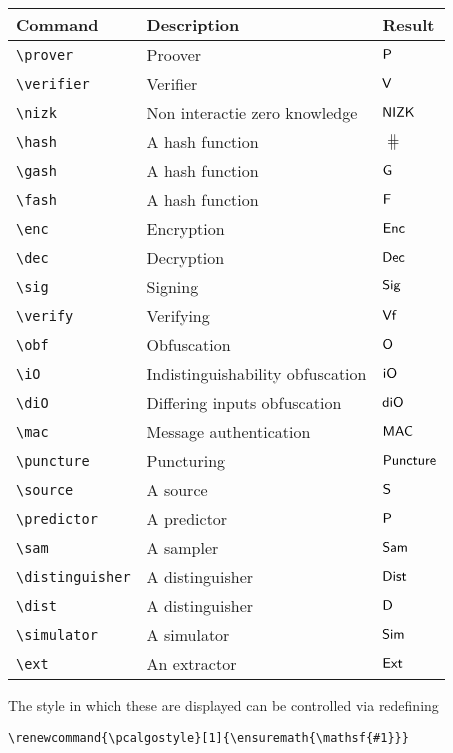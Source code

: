 \documentclass[a4paper]{report}
\begin{document}
\begin{center}
\begin{tabular}{l l l}
\textbf{Command} & \textbf{Description} & \textbf{Result} \\\hline
\lstinline$\prover$ & Proover & $\prover$  \\
\lstinline$\verifier$ & Verifier & $\verifier$  \\
\lstinline$\nizk$ & Non interactie zero knowledge & $\nizk$  \\
\lstinline$\hash$ & A hash function & $\hash$  \\
\lstinline$\gash$ & A hash function& $\gash$  \\
\lstinline$\fash$ & A hash function & $\fash$  \\
\lstinline$\enc$ & Encryption  & $\enc$  \\
\lstinline$\dec$ & Decryption & $\dec$  \\
\lstinline$\sig$ & Signing & $\sig$  \\
\lstinline$\verify$ & Verifying & $\verify$  \\
\lstinline$\obf$ & Obfuscation & $\obf$  \\
\lstinline$\iO$ & Indistinguishability obfuscation & $\iO$  \\
\lstinline$\diO$ & Differing inputs obfuscation & $\diO$  \\
\lstinline$\mac$ & Message authentication & $\mac$  \\
\lstinline$\puncture$ & Puncturing & $\puncture$  \\
\lstinline$\source$ & A source & $\source$  \\
\lstinline$\predictor$ & A predictor & $\predictor$  \\
\lstinline$\sam$ & A sampler & $\sam$  \\
\lstinline$\distinguisher$ & A distinguisher & $\distinguisher$  \\
\lstinline$\dist$ & A distinguisher& $\dist$  \\
\lstinline$\simulator$ & A simulator & $\simulator$  \\
\lstinline$\ext$ & An extractor & $\ext$
\end{tabular}
\end{center}

The style in which these are displayed can be controlled via redefining
\begin{lstlisting}
\renewcommand{\pcalgostyle}[1]{\ensuremath{\mathsf{#1}}}
\end{lstlisting}
\end{document}
